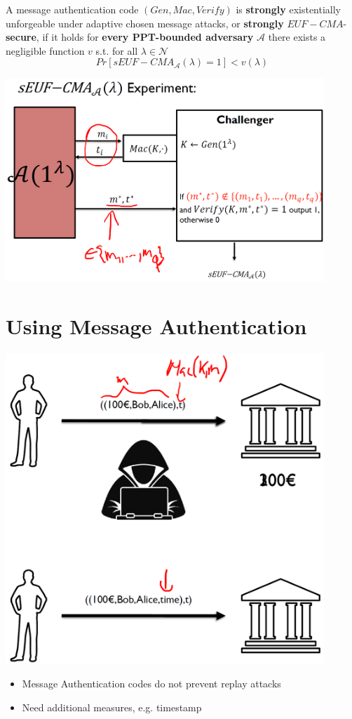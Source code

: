 	\begin{definition}
		A message authentication code $(Gen,Mac,Verify)$ is \textbf{strongly} existentially unforgeable under adaptive chosen message attacks, or \textbf{strongly} $EUF-CMA$-\textbf{secure}, 
		if it holds for \textbf{every PPT-bounded adversary} $\mathcal{A}$ there exists a negligible function $v$ s.t. for all $\lambda \in \mathcal{N}$
		$$Pr[sEUF-CMA_{\mathcal{A}}(\lambda) = 1] < v(\lambda)$$
	\end{definition}
	\begin{center}
		\includegraphics[width=120mm]{Graphics/Authentication/a4.png}
	\end{center}

\section{Using Message Authentication}
	\begin{center}
		\includegraphics[width=120mm]{Graphics/Authentication/a5.png}
	\end{center}
	\begin{itemize}
		\item Message Authentication codes do not prevent replay attacks
		\item Need additional measures, e.g. timestamp
	\end{itemize}

